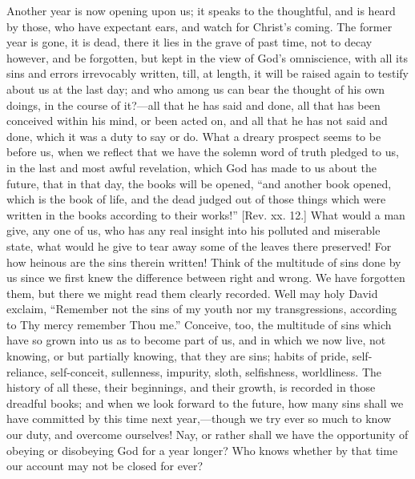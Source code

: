 Another year is now opening upon us; it speaks to the thoughtful,
and is heard by those, who have expectant ears, and watch for Christ's
coming. The former year is gone, it is dead, there it lies in the
grave of past time, not to decay however, and be forgotten, but kept
in the view of God's omniscience, with all its sins and errors
irrevocably written, till, at length, it will be raised again to
testify about us at the last day; and who among us can bear the
thought of his own doings, in the course of it?—all that he has said
and done, all that has been conceived within his mind, or been acted
on, and all that he has not said and done, which it was a duty to say
or do. What a dreary prospect seems to be before us, when we reflect
that we have the solemn word of truth pledged to us, in the last and
most awful revelation, which God has made to us about the future, that
in that day, the books will be opened, ``and another book opened,
which is the book of life, and the dead judged out of those things
which were written in the books according to their works!'' [Rev.
xx. 12.] What would a man give, any one of us, who has any real
insight into his polluted and miserable state, what would he give to
tear away some of the leaves there preserved! For how heinous are the
sins therein written! Think of the multitude of sins done by us since
we first knew the difference between right and wrong. We have
forgotten them, but there we might read them clearly recorded. Well
may holy David exclaim, ``Remember not the sins of my youth nor my
transgressions, according to Thy mercy remember Thou me.''
Conceive, too, the multitude of sins which have so grown into us as to
become part of us, and in which we now live, not knowing, or but
partially knowing, that they are sins; habits of pride, self-reliance,
self-conceit, sullenness, impurity, sloth, selfishness, worldliness.
The history of all these, their beginnings, and their growth, is
recorded in those dreadful books; and when we look forward to the
future, how many sins shall we have committed by this time next year,—though
we try ever so much to know our duty, and overcome ourselves! Nay, or
rather shall we have the opportunity of obeying or disobeying God for
a year longer? Who knows whether by that time our account may not be
closed for ever?


